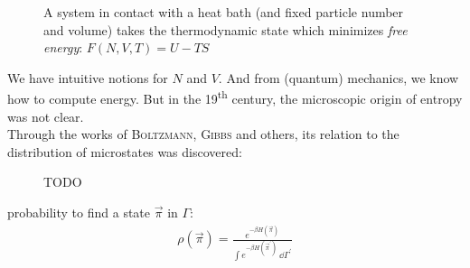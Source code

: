 \begin{figure}[!h]
\centering
{}
\caption{A system in contact with a heat bath (and fixed particle number and volume) takes the thermodynamic state which minimizes \emph{free energy}:
$F(N, V, T) = U - TS$}
\end{figure}

We have intuitive notions for $N$ and $V$. And from (quantum) mechanics, we know how to compute energy. But in the 19\textsuperscript{th} century, the microscopic origin of entropy was not clear.\\

Through the works of \textsc{Boltzmann}, \textsc{Gibbs} and others, its relation to the distribution of microstates was discovered:

\begin{figure}[!h]
\centering
{}
\caption{TODO}
\end{figure}

probability to find a state $\vec{\pi}$ in $\Gamma$: 
\begin{align}
\rho(\vec{\pi}) = \frac{e^{-\beta H(\vec{\pi})}}{\int e^{-\beta H(\vec{\pi}^\prime)}\ \dd\Gamma^\prime}
\end{align}
